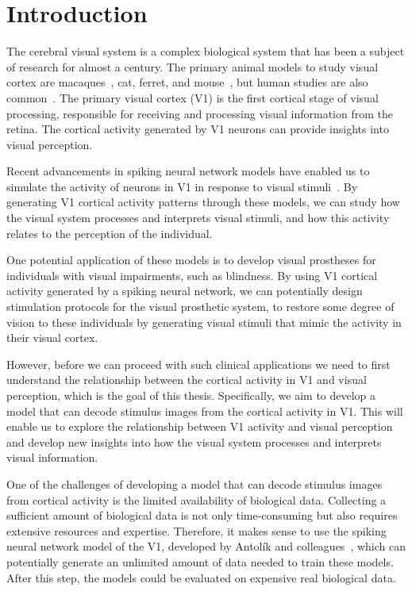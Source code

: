 \chapter{Introduction}
\label{intro}
The cerebral visual system is a complex biological system that has been a subject of research for almost a century. The primary animal models to study visual cortex are macaques~\citep{felleman1991distributed, boussaoud1990pathways}, cat, ferret, and  mouse~\citep{marshel2011functional, beltramo2019collicular}, but human studies are also common~\citep{boynton1996linear, wandell2007visual}. The primary visual cortex (V1) is the first cortical stage of visual processing, responsible for receiving and processing visual information from the retina. The cortical activity generated by V1 neurons can provide insights into visual perception.

Recent advancements in spiking neural network models have enabled us to simulate the activity of neurons in V1 in response to visual stimuli~\citep{antolik2018comprehensive}. By generating V1 cortical activity patterns through these models, we can study how the visual system processes and interprets visual stimuli, and how this activity relates to the perception of the individual.

One potential application of these models is to develop visual prostheses for individuals with visual impairments, such as blindness. By using V1 cortical activity generated by a spiking neural network, we can potentially design stimulation protocols for the visual prosthetic system, to restore some degree of vision to these individuals by generating visual stimuli that mimic the activity in their visual cortex.

However, before we can proceed with such clinical applications we need to first understand the relationship between the cortical activity in V1 and visual perception, which is the goal of this thesis. Specifically, we aim to develop a model that can decode stimulus images from the cortical activity in V1. This will enable us to explore the relationship between V1 activity and visual perception and develop new insights into how the visual system processes and interprets visual information.

One of the challenges of developing a model that can decode stimulus images from cortical activity is the limited availability of biological data. Collecting a sufficient amount of biological data is not only time-consuming but also requires extensive resources and expertise. Therefore, it makes sense to use the spiking neural network model of the V1, developed by Antolík and colleagues~\citep{antolik2018comprehensive}, which can potentially generate an unlimited amount of data needed to train these models. After this step, the models could be evaluated on expensive real biological data.

